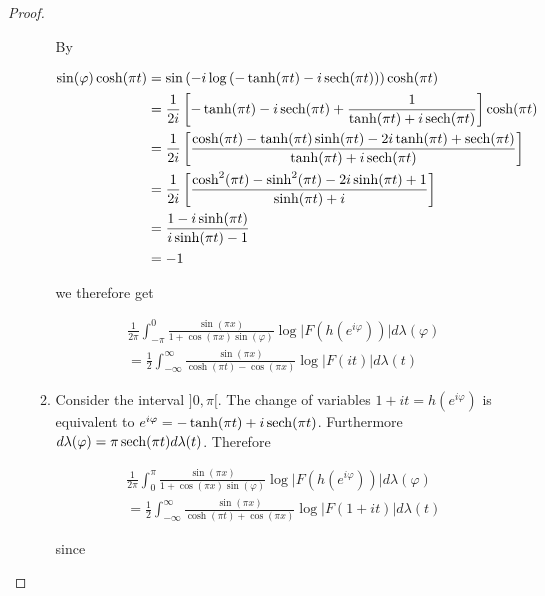 \begin{proof}
\begin{enumerate}[label = \textbf{(\roman*.)}]
\begin{enumerate}[label = \textbf{\alph*.}]
				By 

				\begin{gather*}
					\begin{aligned}
						\sin(\varphi)\cosh(\pi t) &= \sin\left( -i\log\left( -\tanh (\pi t) - i \operatorname{sech}(\pi t) \right)\right) \cosh(\pi t)\\
						&= \frac{1}{2i} \left[ -\tanh(\pi t) - i\operatorname{sech}(\pi t) + \frac{1}{\tanh(\pi t) + i\operatorname{sech}(\pi t) }\right]\cosh(\pi t)\\
						&= \frac{1}{2i} \left[ \frac{\cosh(\pi t) - \tanh(\pi t) \sinh(\pi t) - 2i\tanh(\pi t) + \operatorname{sech}(\pi t)}{\tanh(\pi t) + i\operatorname{sech}(\pi t)}\right]\\
						&= \frac{1}{2i} \left[ \frac{\cosh^2(\pi t) - \sinh^2(\pi t) - 2i \sinh(\pi t) + 1}{\sinh(\pi t) + i}\right]\\
						&= \frac{1 - i\sinh(\pi t)}{i\sinh(\pi t) - 1}\\
						&= -1
					\end{aligned}
				\end{gather*}

				we therefore get

				\begin{multline}
					\frac{1}{2\pi} \int_{-\pi}^0 \frac{\sin(\pi x)}{1 + \cos(\pi x)\sin(\varphi)} \log \vert F(h(e^{i\varphi}))\vert d\lambda(\varphi)\\ = \frac{1}{2}\int_{-\infty}^\infty\frac{\sin(\pi x)}{\cosh(\pi t) - \cos(\pi x)} \log\vert F(it) \vert d\lambda(t)
				\end{multline}

		\item Consider the interval $]0,\pi[$. The change of variables $1 + it = h(e^{i\varphi})$ is equivalent to $e^{i\varphi} = - \tanh(\pi t) + i\operatorname{sech}(\pi t)$. Furthermore $d\lambda(\varphi) = \pi \operatorname{sech}(\pi t) d\lambda(t)$. Therefore 

				\begin{multline}
					\frac{1}{2\pi} \int_0^\pi \frac{\sin(\pi x)}{1 + \cos(\pi x)\sin(\varphi)} \log \vert F(h(e^{i\varphi}))\vert d\lambda(\varphi)\\ = \frac{1}{2}\int_{-\infty}^\infty\frac{\sin(\pi x)}{\cosh(\pi t) + \cos(\pi x)} \log\vert F(1 + it) \vert d\lambda(t)
				\end{multline}

				since


\end{enumerate}
\end{enumerate}
\end{proof}
